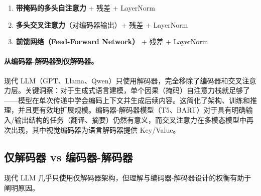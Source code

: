 \begin{enumerate}
  \item \textbf{带掩码的多头自注意力} + 残差 + LayerNorm
  \item \textbf{多头交叉注意力}（对编码器输出）+ 残差 + LayerNorm
  \item \textbf{前馈网络（Feed-Forward Network）} + 残差 + LayerNorm
\end{enumerate}

\paragraph{从编码器-解码器到仅解码器。}
\label{from-encoder-decoder-to-decoder-only.}

现代 LLM（GPT、Llama、Qwen）只使用解码器，完全移除了编码器和交叉注意力层。关键洞察：对于生成式语言建模，单个因果（掩码）自注意力栈就足够了——模型在单次传递中学会编码上下文并生成后续内容。这简化了架构、训练和推理，并且更有效地扩展规模。编码器-解码器模型（T5、BART）对于具有明确输入/输出结构的任务（翻译、摘要）仍然有意义，而交叉注意力在多模态模型中再次出现，其中视觉编码器为语言解码器提供 Key/Value。

\subsection{仅解码器 vs 编码器-解码器}
\label{decoder-only-vs-encoder-decoder}

现代 LLM 几乎只使用仅解码器架构，但理解与编码器-解码器设计的权衡有助于阐明原因。

